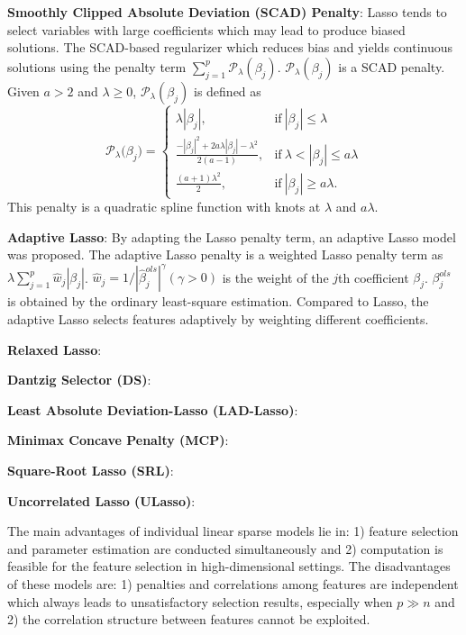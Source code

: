 \documentclass[lang=cn,10pt]{gorgeousnbook}
\numberwithin{equation}{section}%
\numberwithin{figure}{section}%
\begin{document}
\textbf{Smoothly Clipped Absolute Deviation (SCAD) Penalty}: Lasso tends to select variables with large coefficients
which may lead to produce biased solutions. The SCAD-based regularizer which reduces bias and yields continuous solutions using the penalty term $\sum_{j=1}^p\mathcal{P}_\lambda(\beta_j)$. $\mathcal{P}_\lambda(\beta_j)$ is a SCAD penalty. Given $a > 2$ and $\lambda \ge 0$, $\mathcal{P}_\lambda(\beta_j)$ is defined as 
\begin{equation}
\mathcal{P}_{\lambda}\big(\beta_{j}\big)=\begin{cases}\lambda|\beta_{j}|,&\text{if}\  |\beta_{j}|\leq\lambda\\ \frac{-|\beta_{j}|^{2}+2a\lambda|\beta_{j}|-\lambda^{2}}{2(a-1)},&\text{if}\  \lambda<|\beta_{j}|\leq a\lambda\\ \frac{(a+1)\lambda^{2}}{2}, &\text{if}\  |\beta_{j}|\geq a\lambda.\end{cases}
\end{equation}
This penalty is a quadratic spline function with knots at $\lambda$ and $a\lambda$.

\textbf{Adaptive Lasso}: By adapting the Lasso penalty term, an adaptive Lasso model was proposed. The adaptive Lasso penalty is a weighted Lasso penalty term as $ \lambda\sum_{j=1}^p\hat{w}_j|\beta_j|$. $\hat{w}_j = 1/|\hat{\beta}_j^{ols}|^\gamma(\gamma>0)$ is the weight of the $j$th coefficient $\beta_j$. $\beta_{j}^{ols}$ is obtained by the ordinary least-square estimation. Compared to Lasso, the adaptive Lasso selects features adaptively by weighting different coefficients.

\textbf{Relaxed Lasso}: 

\textbf{Dantzig Selector (DS)}:

\textbf{Least Absolute Deviation-Lasso (LAD-Lasso)}:

\textbf{Minimax Concave Penalty (MCP)}: 

\textbf{Square-Root Lasso (SRL)}:

\textbf{Uncorrelated Lasso (ULasso)}:

The main advantages of individual linear sparse models lie in: 1) feature selection and parameter estimation are conducted simultaneously and 2) computation is feasible for the feature selection in high-dimensional settings. The disadvantages of these models are: 1) penalties and correlations among features are independent which always leads to unsatisfactory selection results, especially when $p\gg n$  and 2) the correlation structure between features cannot be exploited.
\end{document}
